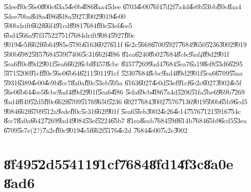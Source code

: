 \documentclass[12pt,a4paper]{article}
\begin{document}
\U{5dee}\U{ff0c}\U{56e0}\U{800c}\U{63a5}\U{4e0b}\U{4f86}\U{8aa4}\U{5dee}%
\U{6703}\U{4e00}\U{76f4}\U{7d2f}\U{7a4d}\U{4e0b}\U{53bb}\U{ff0c}\U{8aa4}%
\U{5dee}\U{70ba}\U{8d8a}\U{4f86}\U{8d8a}\U{5927}\U{3002}\U{9019}\U{4e00}%
\U{500b}drift\U{662f}\U{66f4}\U{91cd}\U{8981}\U{7684}\U{ff0c}\U{53ef}\U{4ee5}%
\U{6bd4}\U{566a}\U{97f3}\U{7522}\U{751f}\U{7684}drift\U{9084}\U{5927}\U{ff0c}%
\U{9019}\U{4e5f}\U{662f}\U{6b64}\U{985e}\U{578b}\U{6163}\U{6027}\U{611f}%
\U{6e2c}\U{5668}\U{6700}\U{5927}\U{7684}\U{9650}\U{5236}\U{3002}\U{9019}%
\U{500b}\U{6982}\U{5ff5}\U{7684}\U{539f}\U{7406}\U{5c31}\U{662f}\U{4f86}%
\U{81ea}\U{6240}\U{8b02}\U{7684}\textit{\U{8cbc}\U{9ad4}}\U{89d2}\U{901f}%
\U{5ea6}\U{ff0c}\U{89d2}\U{901f}\U{5ea6}\U{662f}\U{6cbf}\U{8457}\U{8cbc}%
\U{8457}\U{7269}\U{9ad4}\U{7684}\U{5ea7}\U{6a19}\U{8ef8}\U{53d6}\U{6295}%
\U{5f71}\U{5206}\U{91cf}\U{ff0c}\U{56e0}\U{6b64}\U{6211}\U{5011}\U{91cf}%
\U{5230}\U{7684}\U{8cbc}\U{9ad4}\U{89d2}\U{901f}\U{5ea6}\U{6709}\U{55aa}%
\U{5931}\U{6389}\U{4e00}\U{4e9b}\U{8cc7}\U{8a0a}\U{ff0c}\U{53eb}\U{505a}%
\U{6163}\U{6027}\U{4e0d}\U{53ef}\U{91cf}\U{6e2c}\U{6027}\U{3002}\U{4e5f}%
\U{56e0}\U{6b64}\U{4ee5}\U{8cbc}\U{9ad4}\U{89d2}\U{901f}\U{5ea6}\U{4f86}%
\U{5efa}\U{69cb}\U{4f86}\U{7a4d}\U{5206}\U{51fa}\U{5be6}\U{969b}\U{7269}%
\U{9ad4}\U{8f49}\U{52d5}\U{ff0c}\U{662f}\U{6709}\U{5176}\U{9650}\U{5236}%
\U{6027}\U{7684}\U{3002}\U{7576}\U{7136}\U{9019}\U{500b}\U{65b9}\U{6cd5}%
\U{9084}\U{662f}\U{6709}\U{512a}\U{9ede}\U{ff0c}\U{5c31}\U{662f}\U{901f}%
\U{5ea6}\U{5feb}\U{3002}\U{4e26}\U{4e14}\U{7576}\U{7121}\U{5916}\U{754c}%
\U{8cc7}\U{8a0a}\U{6642}\U{7269}\U{9ad4}\U{9084}\U{53ef}\U{5224}\U{65b7}%
\U{81ea}\U{8eab}\U{7684}\U{59ff}\U{614b}\U{7684}\U{65b9}\U{6cd5}\U{53ea}%
\U{6709}\U{5e7e}(2?)\U{7a2e}\U{ff0c}\U{9019}\U{4e5f}\U{662f}\U{5176}\U{4e2d}%
\U{7684}\U{4e00}\U{7a2e}\U{3002}

\bigskip

\section{\U{8f49}\U{52d5}\U{5411}\U{91cf}\U{7684}\U{8fd1}\U{4f3c}\U{8a0e}%
\U{8ad6}}

\bigskip
\end{document}
